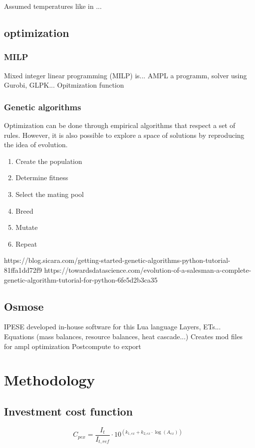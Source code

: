 \documentclass{article}
\begin{document}
Assumed temperatures like in ...

\subsection{optimization}
\subsubsection{MILP}
Mixed integer linear programming (MILP) is... 
AMPL a programm, solver using Gurobi, GLPK...
Opitmization function

\subsubsection{Genetic algorithms}
Optimization can be done through empirical algorithms that respect a set of rules. However, it is also possible to explore a space of solutions by reproducing the idea of evolution.

\begin{enumerate}
\item Create the population
\item Determine fitness
\item Select the mating pool
\item Breed
\item Mutate
\item Repeat
\end{enumerate}

https://blog.sicara.com/getting-started-genetic-algorithms-python-tutorial-81ffa1dd72f9
https://towardsdatascience.com/evolution-of-a-salesman-a-complete-genetic-algorithm-tutorial-for-python-6fe5d2b3ca35


\subsection{Osmose}
IPESE developed in-house software for this
Lua language
Layers, ETs...
Equations (mass balances, resource balances, heat cascade...)
Creates mod files for ampl optimization
Postcompute to export


\section{Methodology}

\subsection{Investment cost function}
\begin{equation}
C_{pex} = \frac{I_{t}}{I_{t,ref}} \cdot 10^ {(k_{1,ex} + k_{2,ex} \cdot \log(A_{ex}))}
\end{equation}
\end{document}
